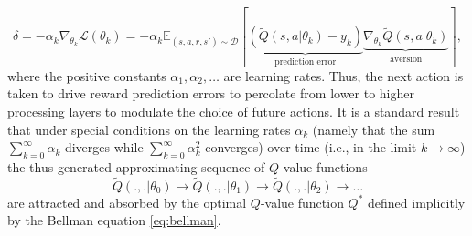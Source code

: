 \documentclass[10pt,letterpaper]{article}
\begin{document}
\begin{equation}
  \delta= -\alpha_k \nabla_{\theta_{k}}\mathcal L(\theta_{k})
  = -\alpha_k\mathbb E_{(s, a, r, s') \sim \mathcal D}[\underbrace{(\tilde{Q}(s, a|\theta_{k}) - y_k)}_{\text{prediction error}}
    \underbrace{\nabla_{\theta_{k}}\tilde{Q}(s, a|\theta_{k})}_{\text{aversion}}],
  \label{eq:oracle}
\end{equation}
where the positive constants $\alpha_1, \alpha_2,\ldots$ are learning rates.
Thus, the next action is taken to drive reward prediction errors
to percolate from lower to higher processing layers to modulate the
choice of future actions. It is a standard result that under special conditions on the learning rates $\alpha_k$
(namely that the sum $\sum_{k=0}^\infty\alpha_k$ diverges while $\sum_{k=0}^\infty\alpha_k^2$ converges) over time (i.e., in the limit $k \rightarrow \infty$)
the thus generated approximating sequence of $Q$-value functions
$$\tilde{Q}(.,.|\theta_0) \rightarrow \tilde{Q}(.,.|\theta_1) \rightarrow \tilde{Q}(.,.|\theta_2) \rightarrow \ldots$$
are attracted and absorbed by the optimal $Q$-value function $Q^*$ defined implicitly by the Bellman equation \eqref{eq:bellman}.

\end{document}
